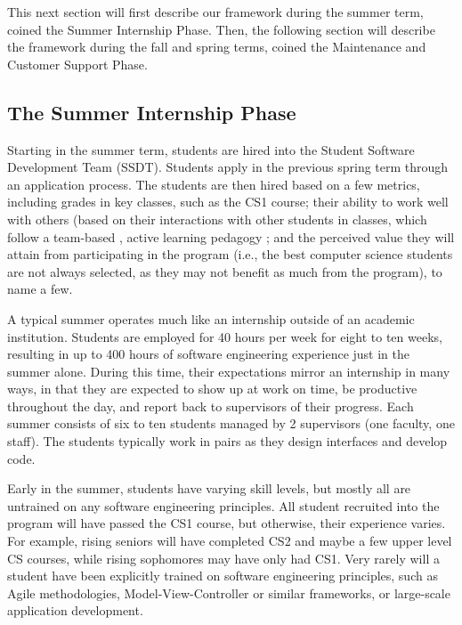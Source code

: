 This next section will first describe our framework during the summer term, coined the Summer Internship Phase. Then, the following section will describe the framework during the fall and spring terms, coined the Maintenance and Customer Support Phase. 

\subsection{The Summer Internship Phase}
Starting in the summer term, students are hired into the Student Software Development Team (SSDT). Students apply in the previous spring term through an application process. The students are then hired based on a few metrics, including grades in key classes, such as the CS1 course; their ability to work well with others (based on their interactions with other students in classes, which follow a team-based \cite{2002PairProgramming}, active learning pedagogy \cite{2012Pogil}; and the perceived value they will attain from participating in the program (i.e., the best computer science students are not always selected, as they may not benefit as much from the program), to name a few. 

A typical summer operates much like an internship outside of an academic institution. Students are employed for 40 hours per week for eight to ten weeks, resulting in up to 400 hours of software engineering experience just in the summer alone. During this time, their expectations mirror an internship in many ways, in that they are expected to show up at work on time, be productive throughout the day, and report back to supervisors of their progress. Each summer consists of six to ten students managed by 2 supervisors (one faculty, one staff). The students typically work in pairs as they design interfaces and develop code. 

Early in the summer, students have varying skill levels, but mostly all are untrained on any software engineering principles. All student recruited into the program will have passed the CS1 course, but otherwise, their experience varies. For example, rising seniors will have completed CS2 and maybe a few upper level CS courses, while rising sophomores may have only had CS1. Very rarely will a student have been explicitly trained on software engineering principles, such as Agile methodologies, Model-View-Controller or similar frameworks, or large-scale application development.

